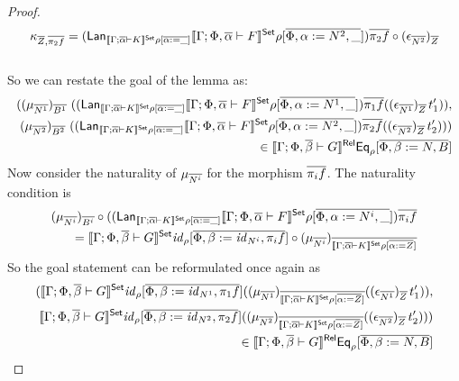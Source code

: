 \documentclass[acmsmall,review,anonymous]{acmart}
\theoremstyle{definition}
\renewcommand{\id}{\mathit{id}}
\begin{document}
\begin{proof}
  $$
  \kappa_{\overline{Z}, \overline{\pi_2 f}}
  = (\mathsf{Lan}_{\llbracket{\Gamma; \overline{\alpha} \vdash K}\rrbracket^{\mathsf{Set}}\rho{[\overline{\alpha := \_}]}}
                  \llbracket{\Gamma; \Phi, \overline{\alpha} \vdash F}\rrbracket^{\mathsf{Set}}
                    \rho{[\overline{\Phi, \alpha := N^2, \_}]}) \overline{\pi_2 f}
  \circ (\epsilon_{\overline{N^2}})_{\overline{Z}}
  $$ \\
So we can restate the goal of the lemma as:
\begin{align*} 
  ((\mu_{\overline{N^1}})_{\overline{B^1}} \,\, 
  ((\mathsf{Lan}_{\llbracket{\Gamma; \overline{\alpha} \vdash K}\rrbracket^{\mathsf{Set}}\rho{[\overline{\alpha := \_}]}}
                  \llbracket{\Gamma; \Phi, \overline{\alpha} \vdash F}\rrbracket^{\mathsf{Set}}
                    \rho{[\overline{\Phi, \alpha := N^1, \_}]}) \overline{\pi_1 f}
  ((\epsilon_{\overline{N^1}})_{\overline{Z}}
        \, t_1' )) , \\
(\mu_{\overline{N^2}})_{\overline{B^2}} \,\,  
  ((\mathsf{Lan}_{\llbracket{\Gamma; \overline{\alpha} \vdash K}\rrbracket^{\mathsf{Set}}\rho{[\overline{\alpha := \_}]}}
                  \llbracket{\Gamma; \Phi, \overline{\alpha} \vdash F}\rrbracket^{\mathsf{Set}}
                    \rho{[\overline{\Phi, \alpha := N^2, \_}]}) \overline{\pi_2 f}
  ((\epsilon_{\overline{N^2}})_{\overline{Z}}
        \, t_2'  ))) \\
        \in \llbracket{\Gamma; \Phi, \overline{\beta} \vdash
    G}\rrbracket^{\mathsf{Rel}}\mathsf{Eq}_{\rho}[\overline{\Phi, \beta := N, B}]
\end{align*}
Now consider the naturality of $\mu_{\overline{N^i}}$ for 
the morphism $\overline{\pi_i f}$. The naturality condition is 
\begin{align*}
(\mu_{\ol{N^i}})_{\ol{B^i}} \circ 
  ((\Lan_{\setsem{\Gamma; \ol\alpha \vdash K}\rho{[\ol{\alpha := \_}]}}
                  \setsem{\Gamma; \Phi, \ol\alpha \vdash F}
                    \rho{[\ol{\Phi, \alpha := N^i, \_}]}) \ol{\pi_i f} \\
= \setsem{\Gamma; \Phi, \ol\beta \vdash G}\id_\rho 
    [\ol{\Phi, \beta := \id_{N^i}, \pi_i f}]
  \circ 
  (\mu_{\ol{N^i}})_{\ol{\setsem{\Gamma; \ol\alpha \vdash K}
      \rho[\ol{\alpha := Z}]}}
\end{align*}
So the goal statement can be reformulated once again as
\begin{align*} 
  (\setsem{\Gamma; \Phi, \ol\beta \vdash G}\id_\rho 
    [\ol{\Phi, \beta := \id_{N^1}, \pi_1 f}]
  ((\mu_{\ol{N^1}})_{\ol{\setsem{\Gamma; \ol\alpha \vdash K}
      \rho[\ol{\alpha := Z}]}}
  ((\epsilon_{\ol{N^1}})_{\ol{Z}}
        \, t_1' )) , \\
  \setsem{\Gamma; \Phi, \ol\beta \vdash G}\id_\rho 
    [\ol{\Phi, \beta := \id_{N^2}, \pi_2 f}]
  ((\mu_{\ol{N^2}})_{\ol{\setsem{\Gamma; \ol\alpha \vdash K}
      \rho[\ol{\alpha := Z}]}}
  ((\epsilon_{\ol{N^2}})_{\ol{Z}}
        \, t_2'  ))) \\
        \in \relsem{\Gamma; \Phi, \ol\beta \vdash
    G}\Eq_{\rho}[\ol{\Phi, \beta := N, B}]
\end{align*}


\end{proof}
\end{document}
